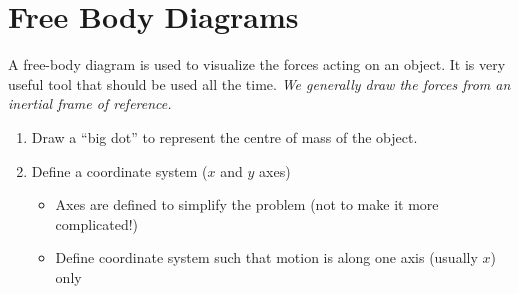 \section{Free Body Diagrams}
A free-body diagram is used to visualize the forces acting on an object. It is
very useful tool that should be used all the time.
\emph{We generally draw the forces from an inertial frame of reference.}

\begin{enumerate}
\item Draw a ``big dot'' to represent the centre of mass of the object.
%  
%    
%    
%  
%
%
%
%
\item Define a coordinate system ($x$ and $y$ axes)
  \begin{itemize}
  \item Axes are defined to simplify the problem (not to make it more
    complicated!)
  \item Define coordinate system such that motion is along one axis (usually
    $x$) only
  \end{itemize}


\end{enumerate}
